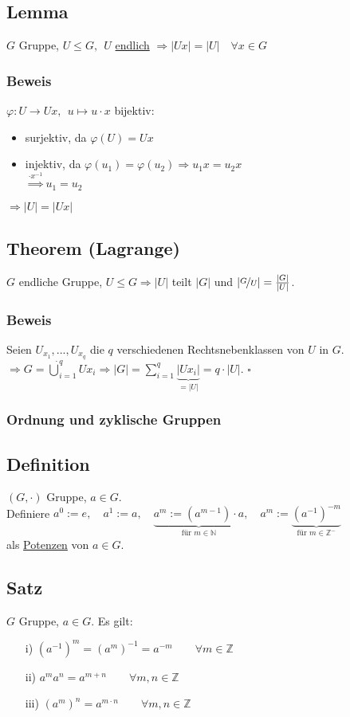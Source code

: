 \documentclass[12pt,titlepage, pdf]{article}
\newcommand{\f}[2]{\nicefrac{#1}{#2}}
\newcommand{\uline}[1]{\underline{#1}}
\renewcommand{\>}{\rightarrow}
\renewcommand{\*}{\cdot}
\renewcommand{\phi}{\varphi}
\begin{document}
\subsection{Lemma}
$G$ Gruppe, $U \leq G,~~ U$ \uline{endlich} $\Rightarrow |Ux| = |U|\quad \forall x \in G$
\subsubsection*{Beweis}
$\phi: U \rightarrow Ux,~~ u \mapsto u \cdot x$ bijektiv:
\begin{itemize}
	\item surjektiv, da $\phi(U) = Ux$
	\item injektiv, da $\phi(u_1) = \phi(u_2) \Rightarrow u_1x = u_2x$\\
	\noindent\hspace*{44.5mm}$\overset{\cdot x^{-1}}{\Rightarrow} u_1 = u_2$
\end{itemize}
$ \Rightarrow |U| = |Ux|$
\subsection{Theorem (Lagrange)}
$G$ endliche Gruppe, $U \leq G \Rightarrow |U|$ teilt $|G|$ und $| \f{G}{U} | = \frac{|G|}{|U|}$.
\subsubsection*{Beweis} Seien $U_{x_1},..., U_{x_q}$ die $q$ verschiedenen Rechtsnebenklassen von $U$ in $G$. \\
$\Rightarrow G = \dot{\bigcup}^q_{i=1} Ux_i \Rightarrow |G| =  \sum_{i = 1}^{q}  \underbrace{|Ux_i|}_{=|U|} = q \cdot |U|.$
\hfill$\square$
\subsubsection*{Ordnung und zyklische Gruppen}
\subsection{Definition}
$(G, \cdot )$ Gruppe, $a \in G$.\\ Definiere $a^0 := e,\quad a^1 := a,\quad \underbrace{a^m := (a^{m-1}) \cdot a}_{\textrm{für }m \in \mathds{N}},\quad a^m := \underbrace{ (a^{-1})^{-m}}_{\textrm{für }m \in \mathds{Z}^-}$\\
als \uline{Potenzen} von $a \in G$.
\subsection{Satz}
$G$ Gruppe, $a \in G$. Es gilt:
\begin{itemize}
	\item[i)] $(a^{-1})^m = (a^m)^{-1} = a^{-m} \qquad \forall m \in \mathbb{Z}$
	\item[ii)] $a^ma^n = a^{m+n} \qquad \forall m,n \in \mathbb{Z}$
	\item[iii)] $(a^m)^n = a^{m \cdot n} \qquad \forall m,n \in \mathbb{Z}$
\end{itemize}
\end{document}
